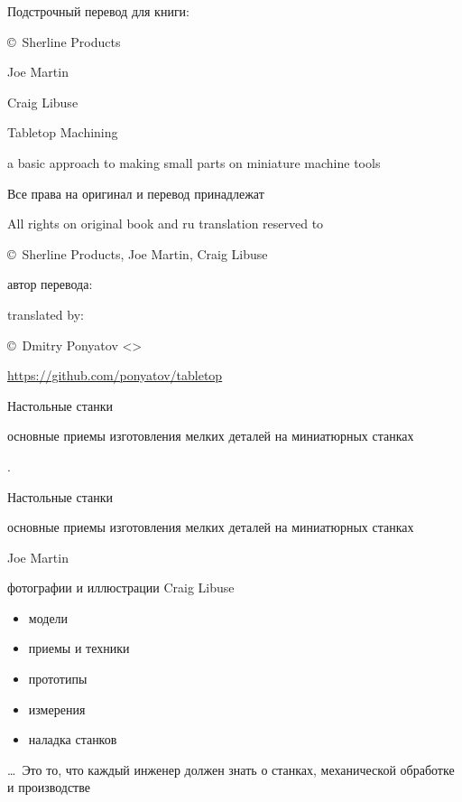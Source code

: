 \begin{titlepage}

Подстрочный перевод для книги:
\bigskip

{\Large \copyright\ Sherline Products}

{\Large Joe Martin}

{\Large Craig Libuse}

\begin{centering}

\bigskip
{\Huge Tabletop Machining}

\bigskip
{\Large a basic approach to making small parts on miniature machine tools}

\end{centering}

\bigskip
Все права на оригинал и перевод принадлежат

All rights on original book and ru translation reserved to

\copyright\ Sherline Products, Joe Martin, Craig Libuse

\bigskip
автор перевода:

translated by:

\copyright\ Dmitry Ponyatov <>

\bigskip
\url{https://github.com/ponyatov/tabletop}

\bigskip
\begin{centering}

\bigskip
{\Huge Настольные станки}

\bigskip
{\Large основные приемы изготовления мелких деталей на миниатюрных станках}

\end{centering}

\end{titlepage}

\begin{titlepage}

.
\vspace{1cm}

\begin{centering}

\bigskip
{\Huge Настольные станки}

\bigskip
{\Large основные приемы изготовления мелких деталей на миниатюрных станках}

\end{centering}

{\Large
\bigskip
Joe Martin

\bigskip
фотографии и иллюстрации Craig Libuse
}

\bigskip
\begin{itemize}
  \item модели
  \item приемы и техники
  \item прототипы
  \item измерения
  \item наладка станков
\end{itemize}

\bigskip
\ldots\ Это то, что каждый инженер должен знать о станках, механической
обработке и производстве

\end{titlepage}
